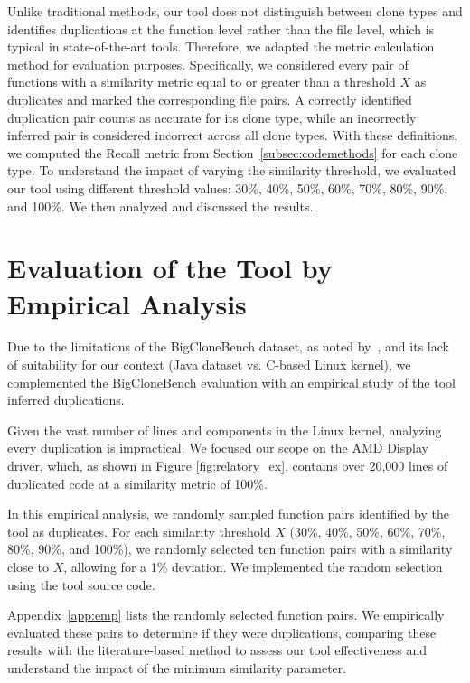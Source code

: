 Unlike traditional methods, our tool does not distinguish between clone types and identifies duplications at the function level rather than the file level, which is typical in state-of-the-art tools. Therefore, we adapted the metric calculation method for evaluation purposes. Specifically, we considered every pair of functions with a similarity metric equal to or greater than a threshold \(X\) as duplicates and marked the corresponding file pairs. A correctly identified duplication pair counts as accurate for its clone type, while an incorrectly inferred pair is considered incorrect across all clone types. With these definitions, we computed the Recall metric from Section~\ref{subsec:codemethods} for each clone type.
%
To understand the impact of varying the similarity threshold, we evaluated our tool using different threshold values: 30\%, 40\%, 50\%, 60\%, 70\%, 80\%, 90\%, and 100\%. We then analyzed and discussed the results.

\section{Evaluation of the Tool by Empirical Analysis}

\label{sec:metemp}

Due to the limitations of the BigCloneBench dataset, as noted by~\cite{bigfail}, and its lack of suitability for our context (Java dataset vs. C-based Linux kernel), we complemented the BigCloneBench evaluation with an empirical study of the tool inferred duplications.

Given the vast number of lines and components in the Linux kernel, analyzing every duplication is impractical. We focused our scope on the AMD Display driver, which, as shown in Figure \ref{fig:relatory_ex}, contains over 20,000 lines of duplicated code at a similarity metric of 100\%.

In this empirical analysis, we randomly sampled function pairs identified by the tool as duplicates. For each similarity threshold \(X\) (30\%, 40\%, 50\%, 60\%, 70\%, 80\%, 90\%, and 100\%), we randomly selected ten function pairs with a similarity close to \(X\), allowing for a 1\% deviation. We implemented the random selection using the tool source code.

Appendix~\ref{app:emp} lists the randomly selected function pairs. We empirically evaluated these pairs to determine if they were duplications, comparing these results with the literature-based method to assess our tool effectiveness and understand the impact of the minimum similarity parameter.

